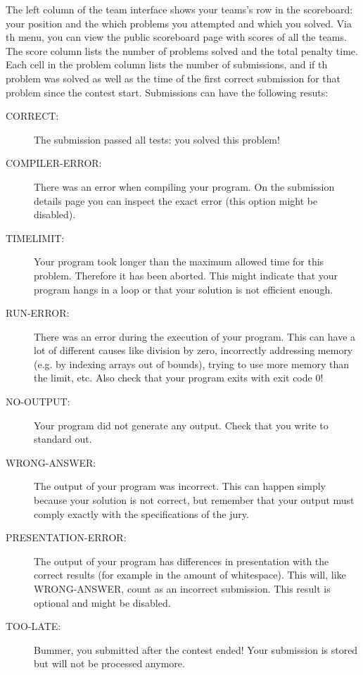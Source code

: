 \documentclass[a4paper]{article}
\begin{document}
The left column of the team interface shows your teams's row in the scoreboard: your position and the which problems you attempted and which you solved. Via th menu, you can view the public scoreboard page with scores of all the teams. The score column lists the number of problems solved and the total penalty time. Each cell in the problem column lists the number of submissions, and if th problem was solved as well as the time of the first correct submission for that problem since the contest start. Submissions can have the following resuts:

\begin{description}
    \item[CORRECT:]
        The submission passed all tests: you solved this problem!

    \item[COMPILER-ERROR:]
        There was an error when compiling your program. On the submission
        details page you can inspect the exact error (this option might be
        disabled).

    \item[TIMELIMIT:]
        Your program took longer than the maximum allowed time for this
        problem. Therefore it has been aborted. This might indicate that your
        program hangs in a loop or that your solution is not efficient
        enough.

    \item[RUN-ERROR:]
        There was an error during the execution of your program. This can have
        a lot of different causes like division by zero, incorrectly
        addressing memory (e.g. by indexing arrays out of bounds), trying to
        use more memory than the limit, etc.
        Also check that your program exits with exit code 0!

    \item[NO-OUTPUT:]
        Your program did not generate any output. Check that you write to
        standard out.

    \item[WRONG-ANSWER:]
        The output of your program was incorrect. This can happen simply
        because your solution is not correct, but remember that your output
        must comply exactly with the specifications of the jury.

    \item[PRESENTATION-ERROR:]
        The output of your program has differences in presentation with the
        correct results (for example in the amount of whitespace). This will,
        like WRONG-ANSWER, count as an incorrect submission. This result is
        optional and might be disabled.

    \item[TOO-LATE:]
        Bummer, you submitted after the contest ended! Your submission is
        stored but will not be processed anymore.
\end{description}
\end{document}
